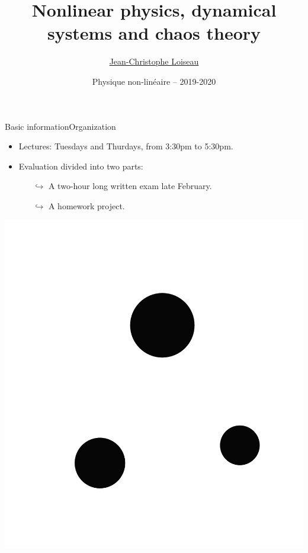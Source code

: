\documentclass[usenames,dvipsnames,svgnames,10pt,aspectratio=169]{beamer}
\title[Nonlinear physics] %
{
	Nonlinear physics, dynamical \\
	systems and chaos theory
}
\author[J.-Ch.~Loiseau] %
{
	\underline{Jean-Christophe Loiseau}
}
\institute[unused]
{
	\url{jean-christophe.loiseau@ensam.eu} \\
	Laboratoire DynFluid \\
	Arts et M\'etiers, France.
}
\date[unused]{Physique non-lin\'eaire -- 2019-2020}
\begin{document}
\titleframe	%


\begin{frame}[t, c]{Basic information}{Organization}
	\begin{minipage}{.68\textwidth}
		\begin{itemize}
			\item Lectures: Tuesdays and Thurdays, from 3:30pm to 5:30pm.

			\bigskip

			\item Evaluation divided into two parts:
			\begin{itemize}
				\item[\( \hookrightarrow \)] A two-hour long written exam late February.
				\item[\( \hookrightarrow \)] A homework project.
			\end{itemize}
		\end{itemize}
	\end{minipage}%
	\hfill
	\begin{minipage}{.28\textwidth}
		\centering
		\includegraphics[width=\textwidth]{Gears}
	\end{minipage}

	\vspace{1cm}
\end{frame}
\end{document}
